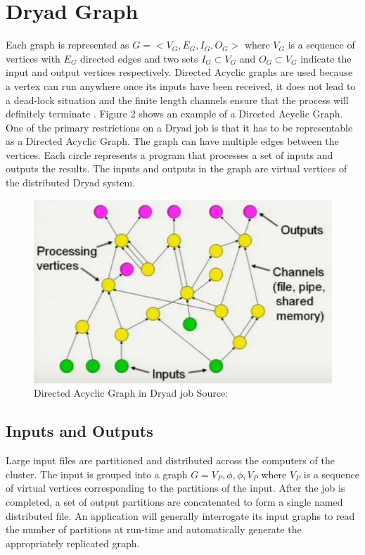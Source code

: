 \documentclass[9pt,twocolumn,twoside]{../../styles/osajnl}
\begin{document}
\section{Dryad Graph}
Each graph is represented as $G = <V_G, E_G, I_G, O_G>$
\cite{DryadMSR2} where $V_G$ is a sequence of vertices with $E_G$
directed edges and two sets $I_G \subset V_G$ and $O_G \subset V_G$
indicate the input and output vertices respectively. Directed Acyclic
graphs are used because a vertex can run anywhere once its inputs have
been received, it does not lead to a dead-lock situation and the
finite length channels ensure that the process will definitely
terminate \cite{www-DryadYT}. Figure 2 shows an example of a Directed
Acyclic Graph. One of the primary restrictions on a Dryad job is that
it has to be representable as a Directed Acyclic Graph. The graph can
have multiple edges between the vertices. Each circle represents a
program that processes a set of inputs and outputs the results. The
inputs and outputs in the graph are virtual vertices of the
distributed Dryad system.
\begin{figure}[htbp]
\begin{center}
\centering
\includegraphics[width=\linewidth]{images/img2}
\caption{Directed Acyclic Graph in Dryad job Source:\cite{www-DryadYT}}
\label{fig:false-color}
\end{center}
\end{figure}
\subsection{Inputs and Outputs}
Large input files are partitioned and distributed across the computers
of the cluster. The input is grouped into a graph $G = V_P , \phi,
\phi, V_P$ where $V_P$ \cite{DryadMSR3} is a sequence of virtual
vertices corresponding to the partitions of the input. After the job
is completed, a set of output partitions are concatenated to form a
single named distributed file. An application will generally
interrogate its input graphs to read the number of partitions at
run-time and automatically generate the appropriately replicated
graph.
\end{document}
